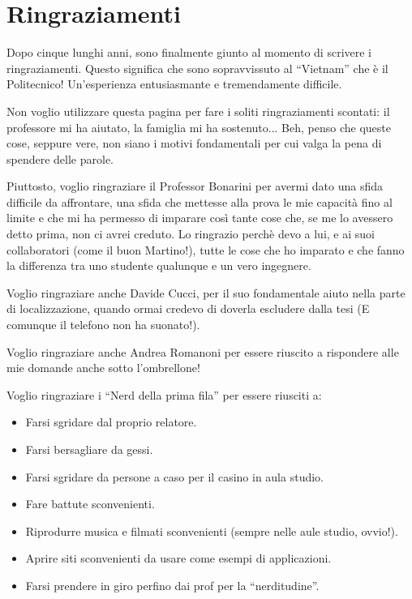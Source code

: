 \chapter*{Ringraziamenti}


Dopo cinque lunghi anni, sono finalmente giunto al momento di scrivere i ringraziamenti. Questo significa che sono sopravvissuto al ``Vietnam'' che è il Politecnico! Un'esperienza entusiasmante e tremendamente difficile.

Non voglio utilizzare questa pagina per fare i soliti ringraziamenti scontati: il professore mi ha aiutato, la famiglia mi ha sostenuto... Beh, penso che queste cose, seppure vere, non siano i motivi fondamentali per cui valga la pena di spendere delle parole.

Piuttosto, voglio ringraziare il Professor Bonarini per avermi dato una sfida difficile da affrontare, una sfida che mettesse alla prova le mie capacità fino al limite e che mi ha permesso di imparare così tante cose che, se me lo avessero detto prima, non ci avrei creduto. Lo ringrazio perchè devo a lui, e ai suoi collaboratori (come il buon Martino!), tutte le cose che ho imparato e che fanno la differenza tra uno studente qualunque e un vero ingegnere.

Voglio ringraziare anche Davide Cucci, per il suo fondamentale aiuto nella parte di localizzazione, quando ormai credevo di doverla escludere dalla tesi (E comunque il telefono non ha suonato!).

Voglio ringraziare anche Andrea Romanoni per essere riuscito a rispondere alle mie domande anche sotto l'ombrellone!

Voglio ringraziare i ``Nerd della prima fila'' per essere riusciti a:
\begin{itemize}[noitemsep, nolistsep]
 \item Farsi sgridare dal proprio relatore.
 \item Farsi bersagliare da gessi.
 \item Farsi sgridare da persone a caso per il casino in aula studio.
 \item Fare battute sconvenienti.
 \item Riprodurre musica e filmati sconvenienti (sempre nelle aule studio, ovvio!).
 \item Aprire siti sconvenienti da usare come esempi di applicazioni.
 \item Farsi prendere in giro perfino dai prof per la ``nerditudine''.
\end{itemize}


